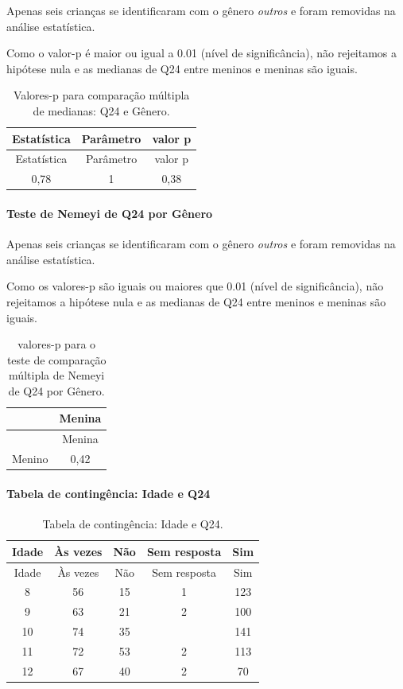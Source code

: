 \documentclass[]{article}
\let\oldparagraph\paragraph
\renewcommand{\paragraph}[1]{\oldparagraph{#1}\mbox{}}
\begin{document}
Apenas seis crianças se identificaram com o gênero \emph{outros} e foram removidas na análise estatística.

Como o valor-p é maior ou igual a 0.01 (nível de significância), não rejeitamos a hipótese nula e as medianas de Q24 entre meninos e meninas são iguais.

\begin{longtable}[]{@{}ccc@{}}
\caption{\label{tab:unnamed-chunk-620}Valores-p para comparação múltipla de medianas: Q24 e Gênero.}\tabularnewline
\toprule
Estatística & Parâmetro & valor p\tabularnewline
\midrule
\endfirsthead
\toprule
Estatística & Parâmetro & valor p\tabularnewline
\midrule
\endhead
0,78 & 1 & 0,38\tabularnewline
\bottomrule
\end{longtable}

\hypertarget{teste-de-nemeyi-de-q24-por-guxeanero}{%
\paragraph{Teste de Nemeyi de Q24 por Gênero}\label{teste-de-nemeyi-de-q24-por-guxeanero}}

Apenas seis crianças se identificaram com o gênero \emph{outros} e foram removidas na análise estatística.

Como os valores-p são iguais ou maiores que 0.01 (nível de significância), não rejeitamos a hipótese nula e as medianas de Q24 entre meninos e meninas são iguais.

\begin{longtable}[]{@{}lc@{}}
\caption{\label{tab:unnamed-chunk-622}valores-p para o teste de comparação múltipla de Nemeyi de Q24 por Gênero.}\tabularnewline
\toprule
& Menina\tabularnewline
\midrule
\endfirsthead
\toprule
& Menina\tabularnewline
\midrule
\endhead
Menino & 0,42\tabularnewline
\bottomrule
\end{longtable}

\cleardoublepage

\hypertarget{tabela-de-continguxeancia-idade-e-q24}{%
\paragraph{Tabela de contingência: Idade e Q24}\label{tabela-de-continguxeancia-idade-e-q24}}

\begin{longtable}[]{@{}ccccc@{}}
\caption{\label{tab:unnamed-chunk-623}Tabela de contingência: Idade e Q24.}\tabularnewline
\toprule
Idade & Às vezes & Não & Sem resposta & Sim\tabularnewline
\midrule
\endfirsthead
\toprule
Idade & Às vezes & Não & Sem resposta & Sim\tabularnewline
\midrule
\endhead
8 & 56 & 15 & 1 & 123\tabularnewline
9 & 63 & 21 & 2 & 100\tabularnewline
10 & 74 & 35 & & 141\tabularnewline
11 & 72 & 53 & 2 & 113\tabularnewline
12 & 67 & 40 & 2 & 70\tabularnewline
\bottomrule
\end{longtable}
\end{document}
